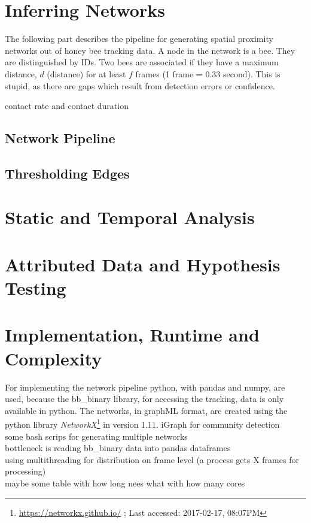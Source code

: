 \section{Inferring Networks}

The following part describes the pipeline for generating spatial proximity networks out of honey bee tracking data. A node in the network is a bee. They are distinguished by IDs. Two bees are associated if they have a maximum distance, $d$ (distance) for at least $f$ frames (1 frame = 0.33 second). This is stupid, as there are gaps which result from detection errors or confidence.

contact rate and contact duration\\

\subsection{Network Pipeline}
\subsection{Thresholding Edges}

\section{Static and Temporal Analysis}	

\section{Attributed Data and Hypothesis Testing}


\section{Implementation, Runtime and Complexity}
For implementing the network pipeline python, with pandas and numpy, are used, because the bb\_binary library, for accessing the tracking, data is only available in python. The networks, in graphML format, are created using the python library \emph{NetworkX}\footnote{\url{https://networkx.github.io/} ; Last accessed: 2017-02-17, 08:07PM} in version 1.11.
iGraph for community detection\\
some bash scrips for generating multiple networks\\

bottleneck is reading bb\_binary data into pandas dataframes\\
using multithreading for distribution on frame level (a process gets X frames for processing)\\

maybe some table with how long nees what with how many cores\\


